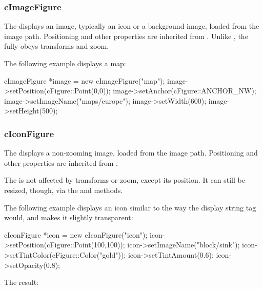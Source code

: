 \subsubsection{cImageFigure}
\label{sec:graphics:imagefigure}

The  displays an image, typically an icon or a background
image, loaded from the {\opp} image path. Positioning and other properties
are inherited from . Unlike ,
the  fully obeys transforms and zoom.

The following example displays a map:

\begin{cpp}
cImageFigure *image = new cImageFigure("map");
image->setPosition(cFigure::Point(0,0));
image->setAnchor(cFigure::ANCHOR_NW);
image->setImageName("maps/europe");
image->setWidth(600);
image->setHeight(500);
\end{cpp}



\subsubsection{cIconFigure}
\label{sec:graphics:iconfigure}

The  displays a non-zooming image, loaded from the {\opp}
image path. Positioning and other properties are inherited from
.

The  is not affected by transforms or zoom, except its
position. It can still be resized, though, via the  and
 methods.

The following example displays an icon similar to the way the
 display string tag would, and makes it slightly
transparent:

\begin{cpp}
cIconFigure *icon = new cIconFigure("icon");
icon->setPosition(cFigure::Point(100,100));
icon->setImageName("block/sink");
icon->setTintColor(cFigure::Color("gold"));
icon->setTintAmount(0.6);
icon->setOpacity(0.8);
\end{cpp}


The result:

\begin{center}
\end{center}


